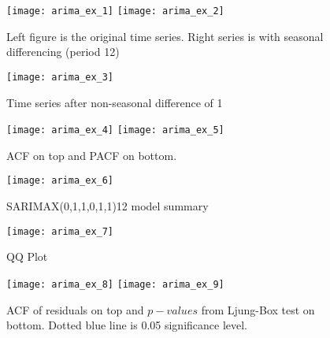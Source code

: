 \documentclass[../../time_series_notes.tex]{subfiles}
\begin{document}
\begin{figure}[h]
    \texttt{[image: arima\_ex\_1]}
    \centering
    \texttt{[image: arima\_ex\_2]}
    \centering
    \caption {Left figure is the original time series. Right series is with seasonal differencing (period 12)}
    \label{fig:arima_ex_2} %
\end{figure}

\begin{figure}[h]
    \texttt{[image: arima\_ex\_3]}
    \centering
    \caption {Time series after non-seasonal difference of 1}
    \label{fig:arima_ex_3} %
\end{figure}

\begin{figure}[h]
    \texttt{[image: arima\_ex\_4]}
    \centering
    \texttt{[image: arima\_ex\_5]}
    \centering
    \caption {ACF on top and PACF on bottom.}
    \label{fig:arima_ex_5} %
\end{figure}

\begin{figure}[h]
    \texttt{[image: arima\_ex\_6]}
    \centering
    \caption {SARIMAX(0,1,1,0,1,1)12 model summary}
    \label{fig:arima_ex_6} %
\end{figure}

\begin{figure}[h]
    \texttt{[image: arima\_ex\_7]}
    \centering
    \caption {QQ Plot}
    \label{fig:arima_ex_7} %
\end{figure}

\begin{figure}[h]
    \texttt{[image: arima\_ex\_8]}
    \centering
    \label{fig:arima_ex_8} %
    \texttt{[image: arima\_ex\_9]}
    \centering
    \caption {ACF of residuals on top and $p-values$ from Ljung-Box test on bottom. Dotted blue line is 0.05 significance level.}
    \label{fig:arima_ex_9} %
\end{figure}
\end{document}
